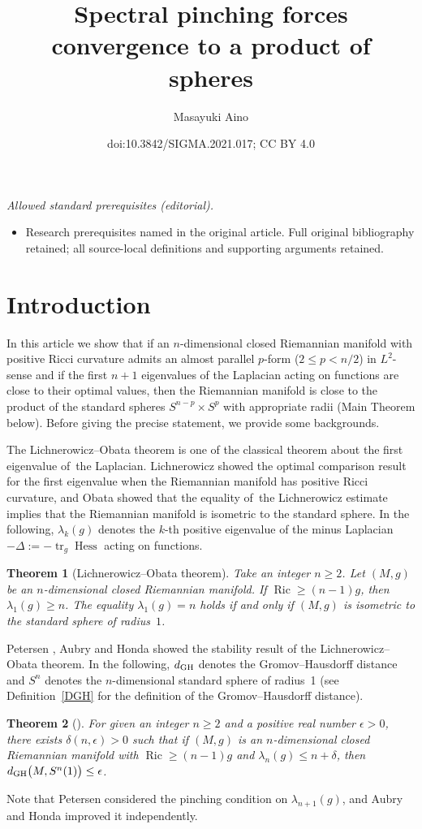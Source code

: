 \documentclass[10pt,a4paper]{amsart}
\title{Spectral pinching forces convergence to a product of spheres}
\author{Masayuki Aino}
\date{doi:10.3842/SIGMA.2021.017; CC BY 4.0}
\numberwithin{equation}{section}
\newtheorem{Thm}{Theorem}[section]
\theoremstyle{definition}
\newcommand{\Ric}{\operatorname{Ric}}
\newcommand{\tr}{\operatorname{tr}}
\newcommand{\Hess}{\operatorname{Hess}}
\begin{document}
\maketitle
\noindent\textit{Allowed standard prerequisites (editorial).}\begin{itemize}
\item Research prerequisites named in the original article. Full original bibliography retained; all source-local definitions and supporting arguments retained.
\end{itemize}\medskip
\section{Introduction}
In this article we show that if an $n$-dimensional closed Riemannian manifold with positive Ricci curvature admits an almost parallel $p$-form ($2\leq p <n/2$) in $L^2$-sense and if the first $n+1$ eigenvalues of the Laplacian acting on functions are close to their optimal values, then the Riemannian manifold is close to the product of the standard spheres $S^{n-p}\times S^p$ with appropriate radii (Main Theorem below).
Before giving the precise statement, we provide some backgrounds.

The Lichnerowicz--Obata theorem is one of the classical theorem about the first eigenvalue of~the Laplacian.
Lichnerowicz showed the optimal comparison result for the first eigenvalue when the Riemannian manifold has positive Ricci curvature, and Obata showed that the equality of~the Lichnerowicz estimate implies that the Riemannian manifold is isometric to the standard sphere.
In the following, $\lambda_k(g)$ denotes the $k$-th positive eigenvalue of the minus Laplacian $-\Delta:=-\tr_g \Hess$ acting on functions.
\begin{Thm}[Lichnerowicz--Obata theorem]\label{LiOb}
Take an integer $n\geq 2$.
Let $(M,g)$ be an $n$-dimen\-sional closed Riemannian manifold. If $\Ric \geq (n-1) g$, then $\lambda_1(g)\geq n$.
The equality $\lambda_1(g)=n$ holds if and only if $(M,g)$ is isometric to the standard sphere of radius~$1$.
\end{Thm}

Petersen \cite{Pe1}, Aubry \cite{Au} and Honda \cite{Ho} showed the stability result of the Lichnerowicz--Obata theorem.
In the following, $d_{{\rm GH}}$ denotes the Gromov--Hausdorff distance and $S^n$ denotes the $n$-dimensional standard sphere of radius~1 (see Definition~\ref{DGH} for the definition of the Gromov--Hausdorff distance).
\begin{Thm}[\cite{Au, Ho, Pe1}]\label{PA}
For given an integer $n\geq 2$ and a positive real number $\epsilon>0$, there exists $\delta(n,\epsilon)>0$ such that if $(M,g)$ is an $n$-dimensional closed Riemannian manifold with $\Ric \geq (n-1) g$ and $\lambda_n(g)\leq n+\delta$, then $d_{{\rm GH}}\big(M,S^n(1)\big)\leq \epsilon$.
\end{Thm}
Note that Petersen considered the pinching condition on $\lambda_{n+1}(g)$, and Aubry and Honda improved it independently.
\end{document}
